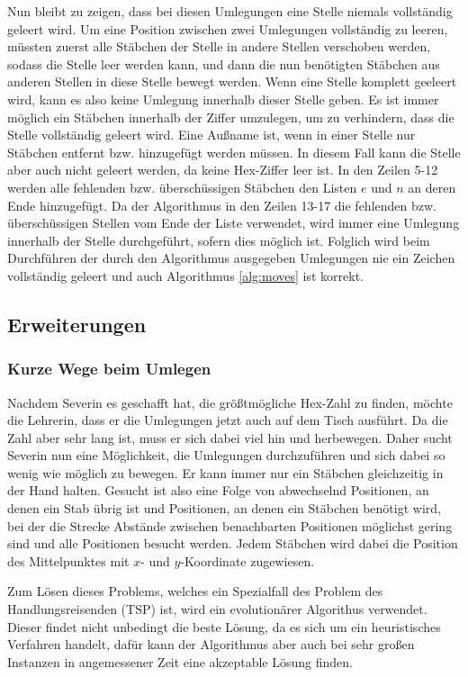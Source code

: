 \documentclass[a4paper,10pt,ngerman]{scrartcl}
\begin{document}
Nun bleibt zu zeigen, dass bei diesen Umlegungen eine Stelle niemals vollständig geleert wird.
Um eine Position zwischen zwei Umlegungen vollständig zu leeren, müssten zuerst alle Stäbchen der Stelle in andere Stellen verschoben werden, sodass die Stelle leer werden kann, und dann die nun benötigten Stäbchen aus anderen Stellen in diese Stelle bewegt werden. 
Wenn eine Stelle komplett geeleert wird, kann es also keine Umlegung innerhalb dieser Stelle geben. 
Es ist immer möglich ein Stäbchen innerhalb der Ziffer umzulegen, um zu verhindern, dass die Stelle vollständig geleert wird. Eine Außname ist, wenn in einer Stelle nur Stäbchen entfernt bzw. hinzugefügt werden müssen. In diesem Fall kann die Stelle aber auch nicht geleert werden, da keine Hex-Ziffer leer ist. 
In den Zeilen 5-12 werden alle fehlenden bzw. überschüssigen Stäbchen den Listen $e$ und $n$ an deren Ende hinzugefügt. 
Da der Algorithmus in den Zeilen 13-17 die fehlenden bzw. überschüssigen Stellen vom Ende der Liste verwendet, wird immer eine Umlegung innerhalb der Stelle durchgeführt, sofern dies möglich ist.
Folglich wird beim Durchführen der durch den Algorithmus ausgegeben Umlegungen nie ein Zeichen vollständig geleert und auch Algorithmus \ref{alg:moves} ist korrekt.

\subsection{Erweiterungen}
\subsubsection{Kurze Wege beim Umlegen}
Nachdem Severin es geschafft hat, die größtmögliche Hex-Zahl zu finden, möchte die Lehrerin, dass er die Umlegungen jetzt auch auf dem Tisch ausführt. Da die Zahl aber sehr lang ist, muss er sich dabei viel hin und herbewegen. Daher sucht Severin nun eine Möglichkeit, die Umlegungen durchzuführen und sich dabei so wenig wie möglich zu bewegen. 
Er kann immer nur ein Stäbchen gleichzeitig in der Hand halten.
Gesucht ist also eine Folge von abwechselnd Positionen, an denen ein Stab übrig ist und Positionen, an denen ein Stäbchen benötigt wird, bei der die Strecke Abstände zwischen benachbarten Positionen möglichst gering sind und alle Positionen besucht werden.
Jedem Stäbchen wird dabei die Position des Mittelpunktes mit $x$- und $y$-Koordinate zugewiesen. 

Zum Lösen dieses Problems, welches ein Spezialfall des Problem des Handlungsreisenden (TSP) ist, wird ein evolutionärer Algorithus verwendet. 
Dieser findet nicht unbedingt die beste Lösung, da es sich um ein heuristisches Verfahren handelt, dafür kann der Algorithmus aber auch bei sehr großen Instanzen in angemessener Zeit eine akzeptable Lösung finden. 
\end{document}
